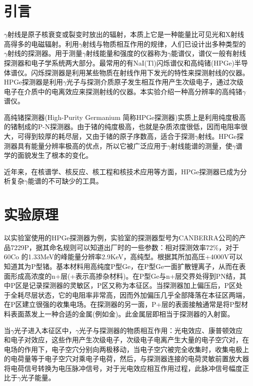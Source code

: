 \documentclass[a4paper,10.0pt,twoside]{npr}
\begin{document}
\begin{multicols}{2}
\section{引言}
$\gamma$射线是原子核衰变或裂变时放出的辐射，本质上它是一种能量比可见光和X射线高得多的电磁辐射。利用$\gamma$射线与物质相互作用的规律，人们已设计出多种类型的$\gamma$射线的探测器。用于测量$\gamma$射线能量和强度的仪器称为$\gamma$能谱仪，谱仪一般有射线探测器和电子学系统两大部分。最常用的有NaI(Tl)闪烁谱仪和高纯锗(HPGe)半导体谱仪。闪烁探测器是利用某些物质在射线作用下发光的特性来探测射线的仪器。HPGe探测器是利用$\gamma$光子与探测介质原子发生相互作用产生次级电子，通过次级电子在介质中的电离效应来探测射线的仪器。本实验介绍一种高分辨率的高纯锗$\gamma$谱仪。

高纯锗探测器(High-Purity Germanium 简称HPGe探测器)实质上是利用纯度极高的锗制成的P-N探测器。由于锗的纯度极高，也就是杂质浓度很低，因而电阻率很大，可得到较厚的耗尽层，又由于锗的原子序数高，适合于探测$\gamma$射线。HPGe探测器具有能量分辨率极高的优点，所以它被广泛应用于$\gamma$射线能谱的测量，使$\gamma$谱学的面貌发生了根本的变化。
   
近年来，在核谱学、核反应、核工程和核技术应用等方面，HPGe探测器已成为分析复杂$\gamma$能谱的不可缺少的工具。

\section{实验原理}    %
\vspace*{-1mm}
\song\wuhao

以实验室使用的HPGe探测器为例，实验室的探测器型号为CANBERRA公司的产品7229P，据其命名规则可以知道出厂时的一些参数：相对探测效率72\%，对于60Co 的1.33MeV的峰能量分辨率2.9KeV，高纯型。根据其所加高压+4000V可以知道其为P型锗。基本材料用高纯度P型Ge，在P型Ge一面扩散锂离子，从而在表面形成高浓度的n+层(+表示高掺杂材料)。在P型Ge与n+层交界处得到PN结，其中P区是记录探测器的灵敏区，P区又称为本征区。当探测器加上偏压后，P区处于全耗尽层状态，它的电阻率非常高，因而外加偏压几乎全部降落在本征区两端，在P区建立很强的收集电场。在探测器的另一面，P+层的表面接触通常是将P型材料表面蒸发上一种合适的金属(例如金)。此金属层即相当于探测器的入射窗。

当$\gamma$光子进入本征区中，$\gamma$光子与探测器的物质相互作用：光电效应、康普顿效应和电子对效应，这些作用产生次级电子，次级电子电离产生大量的电子空穴对，在电场的作用下，电子空穴分别向两极移动，当电子空穴被完全收集时，收集电极上的电荷量等于电子空穴对乘电子电荷，然后，与探测器连接的电荷灵敏前置放大器将电荷信号转换为电压脉冲信号，对于光电效应相互作用过程，此脉冲信号幅度正比于$\gamma$光子能量。



\end{multicols}
\end{document}
